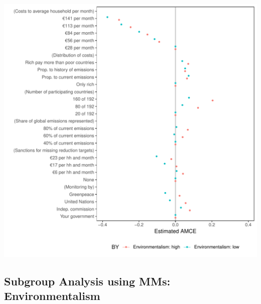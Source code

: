 \documentclass[a4paper,12pt]{article}\usepackage[]{graphicx}\usepackage[]{color}
\makeatletter
\def\maxwidth{ %
  \ifdim\Gin@nat@width>\linewidth
    \linewidth
  \else
    \Gin@nat@width
  \fi
}
\newenvironment{knitrout}{}{} %
\makeatother
\begin{document}
\begin{knitrout}
\color{fgcolor}
\includegraphics[width=\maxwidth]{figure/bechtel_subgroup_amce_environmentalism-1} 

\end{knitrout}

\clearpage

\subsection{Subgroup Analysis using MMs: Environmentalism}
\end{document}
